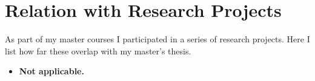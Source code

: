 
\chapter{Relation with Research Projects}
\label{ch:relation_research project}

As part of my master courses I participated in a series of research projects.
Here I list how far these overlap with my master's thesis.

\begin{itemize}
\item \textbf{Not applicable.}
\end{itemize}
